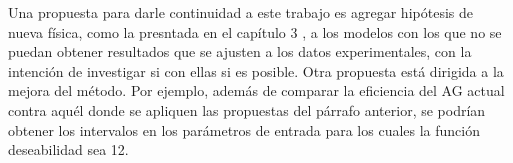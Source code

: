 Una propuesta para darle continuidad a este trabajo es agregar hip\'otesis de
nueva f\'isica, como la presntada en el cap\'itulo 3 \cite{Bra200601}, a los
modelos con los que no se puedan obtener resultados que
se ajusten a los datos experimentales, con la intenci\'on de investigar si con
ellas si es posible. Otra propuesta est\'a dirigida a la mejora del
m\'etodo. Por ejemplo, adem\'as de comparar la eficiencia del AG actual contra
aqu\'el donde se apliquen las propuestas del p\'arrafo anterior, se podr\'ian
obtener los intervalos en los par\'ametros de entrada para los cuales la
funci\'on deseabilidad sea 12.
